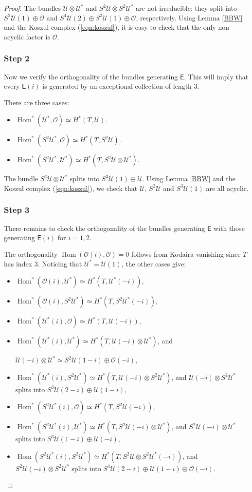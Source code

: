 \documentclass[JEP,XML,SOM,Unicode,NoEqCountersInSection]{cedram}
\let\mathcal\mathscr
\theoremstyle{plain}
\theoremstyle{definition}
\newcommand{\cat}[1]{\mathsf{#1}}
\DeclareMathOperator{\Hom}{Hom}
\newcommand{\sheaf}[1]{\mathcal{#1}}
\newcommand{\ko}{\sheaf{O}}\let\OO\ko\let\cO\ko
\newcommand{\ku}{\sheaf{U}}
\begin{document}
\begin{proof}
The bundles $\ku \otimes \ku^*$ and $S^2\ku \otimes S^2\ku^*$ are not irreducible:
they split into \hbox{$S^2 \ku(1)\oplus \ko$} and $S^4 \ku (2) \oplus S^2 \ku (1)
\oplus \ko$, respectively.
Using Lemma \ref{BBW} and the Koszul complex (\ref{eqn:koszul}), it is easy to check that the only non acyclic factor is $\ko$.

\subsubsection*{Step 2}
Now we verify the orthogonality of the bundles generating $\cat{E}$. This will imply
that every $\cat{E}(i)$ is generated by an exceptional collection of length 3.

There are three cases:

\begin{itemize}
\item $\Hom^*(\ku^*,\ko) \simeq H^*(T,\ku)$.
\item $\Hom^*(S^2\ku^*,\ko) \simeq H^*(T,S^2\ku)$.
\item $\Hom^*(S^2\ku^*,\ku^*) \simeq H^*(T,S^2\ku\otimes\ku^*)$.
\end{itemize}

The bundle $S^2\ku \otimes\ku^*$ splits into $S^3 \ku (1) \oplus \ku$.
Using Lemma \ref{BBW} and the Koszul complex (\ref{eqn:koszul}), we check that $\ku$, $S^2\ku$ and $S^3 \ku (1)$ are all acyclic.

\subsubsection*{Step 3}
There remains to check the orthogonality of the bundles generating $\cat{E}$ with those generating $\cat{E}(i)$ for $i=1,2$.

The orthogonality $\Hom(\ko(i),\ko)=0$ follows from Kodaira vanishing since $T$ has index 3. Noticing that $\ku^*=\ku(1)$, the other cases give:

\begin{itemize}
\item $\Hom^*(\ko(i),\ku^*) \simeq H^*(T,\ku^*(-i))$,
\item $\Hom^*(\ko(i),S^2\ku^*) \simeq H^*(T,S^2\ku^*(-i))$,
\item $\Hom^*(\ku^*(i),\ko) \simeq H^*(T,\ku(-i))$,
\item $\Hom^*(\ku^*(i),\ku^*) \simeq H^*(T,\ku(-i) \otimes \ku^*)$, and\par\noindent$\ku(-i) \otimes \ku^* \simeq S^2 \ku (1-i) \oplus \ko(-i)$,
\item $\Hom^*(\ku^*(i),S^2\ku^*) \simeq H^*(T,\ku(-i) \otimes S^2\ku^*)$, and $\ku(-i) \otimes S^2\ku^*$ splits into $S^3 \ku(2-i)\oplus \ku (1-i)$,
\item $\Hom^*(S^2\ku^*(i),\ko) \simeq H^*(T,S^2\ku(-i))$,
\item $\Hom^*(S^2\ku^*(i),\ku^*) \simeq H^*(T,S^2\ku(-i) \otimes \ku^*)$, and $S^2\ku(-i) \otimes \ku^*$ splits into $S^3\ku (1-i) \oplus \ku(-i)$,
\item $\Hom(S^2\ku^*(i),S^2\ku^*) \simeq H^*(T,S^2\ku \otimes S^2 \ku^* (-i))$, and $S^2\ku(-i) \otimes S^2\ku^*$ splits into $S^4\ku (2-i)\oplus \ku(1-i)\oplus \ko(-i)$.
\end{itemize}


\end{proof}
\end{document}
